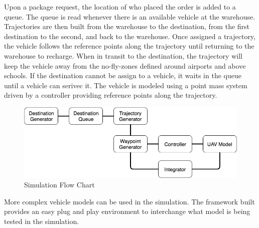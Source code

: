 Upon a package request, the location of who placed the order is added to a queue. The queue is read whenever there is an available vehicle at the warehouse. Trajectories are then built from the warehouse to the destination, from the first destination to the second, and back to the warehouse. Once assigned a trajectory, the vehicle follows the reference points along the trajectory until returning to the warehouse to recharge. When in transit to the destination, the trajectory will keep the vehicle away from the no-fly-zones defined around airports and above schools. If the destination cannot be assign to a vehicle, it waits in the queue until a vehicle can serivec it. The vehicle is modeled using a point mass system driven by a controller providing reference points along the trajectory.

\begin{figure}
\includegraphics[width=1\linewidth]{images/TopLevelDesign.png}
\caption{Simulation Flow Chart}
\end{figure}

More complex vehicle models can be used in the simulation. The framework built provides an easy plug and play environment to interchange what model is being tested in the simulation.


